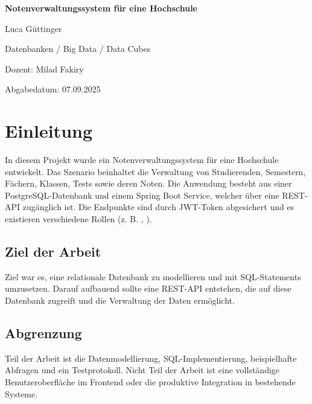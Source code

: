 \documentclass[12pt,a4paper]{article}
\newcommand{\code}[1]{\texttt{\detokenize{#1}}}
\begin{document}
    \hypersetup{pageanchor=false}
    \begin{titlepage}
        \centering
        {\huge\bfseries Notenverwaltungssystem für eine Hochschule \par}
        \vspace{2cm}
        {\Large Luca Güttinger \par}
        \vspace{0.5cm}
        {\Large Datenbanken / Big Data / Data Cubes \par}
        \vspace{0.5cm}
        {\Large Dozent: Milad Fakiry \par}
        \vspace{0.5cm}
        {\Large Abgabedatum: 07.09.2025 \par}
        \vfill
    \end{titlepage}
    \clearpage
    \hypersetup{pageanchor=true}

    \tableofcontents
    \newpage

    \section{Einleitung}
    In diesem Projekt wurde ein Notenverwaltungssystem für eine Hochschule entwickelt.
    Das Szenario beinhaltet die Verwaltung von Studierenden, Semestern, Fächern, Klassen, Tests sowie deren Noten.
    Die Anwendung besteht aus einer PostgreSQL-Datenbank und einem Spring Boot Service, welcher über eine REST-API zugänglich ist.
    Die Endpunkte sind durch JWT-Token abgesichert und es existieren verschiedene Rollen (z. B. \code{ADMIN}, \code{USER}).

    \subsection{Ziel der Arbeit}
    Ziel war es, eine relationale Datenbank zu modellieren und mit SQL-Statements umzusetzen.
    Darauf aufbauend sollte eine REST-API entstehen, die auf diese Datenbank zugreift und die Verwaltung der Daten ermöglicht.

    \subsection{Abgrenzung}
    Teil der Arbeit ist die Datenmodellierung, SQL-Implementierung, beispielhafte Abfragen und ein Testprotokoll.
    Nicht Teil der Arbeit ist eine vollständige Benutzeroberfläche im Frontend oder die produktive Integration in bestehende Systeme.
\end{document}
